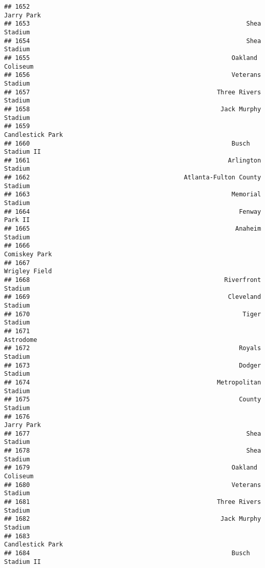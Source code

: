 \documentclass[]{article}
\begin{document}
\begin{verbatim}
## 1652                                                             Jarry Park
## 1653                                                           Shea Stadium
## 1654                                                           Shea Stadium
## 1655                                                       Oakland Coliseum
## 1656                                                       Veterans Stadium
## 1657                                                   Three Rivers Stadium
## 1658                                                    Jack Murphy Stadium
## 1659                                                       Candlestick Park
## 1660                                                       Busch Stadium II
## 1661                                                      Arlington Stadium
## 1662                                          Atlanta-Fulton County Stadium
## 1663                                                       Memorial Stadium
## 1664                                                         Fenway Park II
## 1665                                                        Anaheim Stadium
## 1666                                                          Comiskey Park
## 1667                                                          Wrigley Field
## 1668                                                     Riverfront Stadium
## 1669                                                      Cleveland Stadium
## 1670                                                          Tiger Stadium
## 1671                                                              Astrodome
## 1672                                                         Royals Stadium
## 1673                                                         Dodger Stadium
## 1674                                                   Metropolitan Stadium
## 1675                                                         County Stadium
## 1676                                                             Jarry Park
## 1677                                                           Shea Stadium
## 1678                                                           Shea Stadium
## 1679                                                       Oakland Coliseum
## 1680                                                       Veterans Stadium
## 1681                                                   Three Rivers Stadium
## 1682                                                    Jack Murphy Stadium
## 1683                                                       Candlestick Park
## 1684                                                       Busch Stadium II

\end{verbatim}
\end{document}
